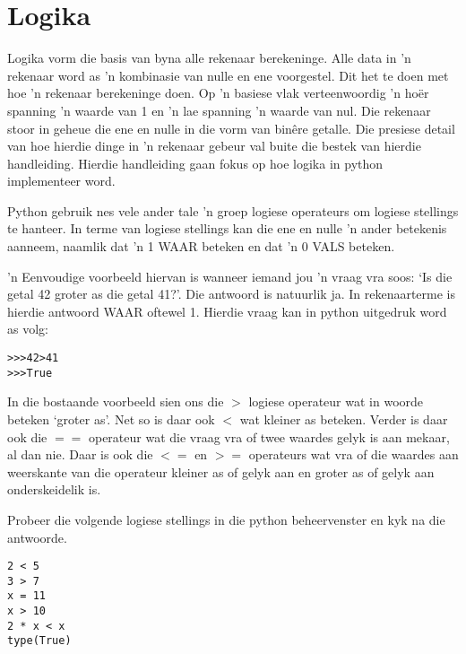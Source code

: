 \section{Logika}

Logika vorm die basis van byna alle rekenaar berekeninge.  Alle data in 'n rekenaar word as 'n kombinasie van nulle en ene voorgestel.  Dit het te doen met hoe 'n rekenaar berekeninge doen.  Op 'n basiese vlak verteenwoordig 'n ho\"er spanning 'n waarde van 1 en 'n lae spanning 'n waarde van nul.  Die rekenaar stoor in geheue die ene en nulle in die vorm van bin\^ere getalle.  Die presiese detail van hoe hierdie dinge in 'n rekenaar gebeur val buite die bestek van hierdie handleiding.  Hierdie handleiding gaan fokus op hoe logika in python implementeer word.

Python gebruik nes vele ander tale 'n groep logiese operateurs om logiese stellings te hanteer.  In terme van logiese stellings kan die ene en nulle 'n ander betekenis aanneem, naamlik dat 'n 1 WAAR beteken en dat 'n 0 VALS beteken.  

'n Eenvoudige voorbeeld hiervan is wanneer iemand jou 'n vraag vra soos:  `Is die getal 42 groter as die getal 41?'.  Die antwoord is natuurlik ja.  In rekenaarterme is hierdie antwoord WAAR oftewel 1.  Hierdie vraag kan in python uitgedruk word as volg:

\begin{lstlisting}[style=DOS]
>>>42>41
>>>True
\end{lstlisting}

In die bostaande voorbeeld sien ons die $>$ logiese operateur wat in woorde beteken `groter as'.  Net so is daar ook $<$ wat kleiner as beteken.  Verder is daar ook die $==$ operateur wat die vraag vra of twee waardes gelyk is aan mekaar, al dan nie.  Daar is ook die $<=$ en $>=$ operateurs wat vra of die waardes aan weerskante van die operateur kleiner as of gelyk aan en groter as of gelyk aan onderskeidelik is.

Probeer die volgende logiese stellings in die python beheervenster en kyk na die antwoorde.

\lstset{language=Python}
\lstset{frame=lines}
\lstset{basicstyle=\footnotesize}
\begin{lstlisting}
2 < 5
3 > 7
x = 11
x > 10
2 * x < x
type(True)
\end{lstlisting}



